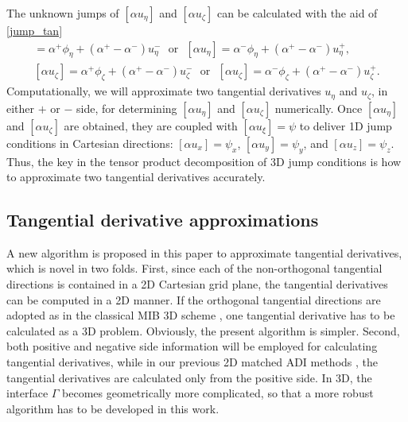 \documentclass[dissertation]{uathesis}
\begin{document}
\begin{body}
\begin{flushleft}
\hspace{1cm} The unknown jumps of $[\alpha u_{\eta}]$ and $[\alpha u_{\zeta}]$ can be calculated with the aid of \eqref{jump_tan}
\begin{align}
[\alpha u_{\eta}] = \alpha^{+}\phi_{\eta} + (\alpha^{+}-\alpha^{-})u^{-}_{\eta} ~~~ \mbox{or} ~~~ [\alpha u_{\eta}]  = \alpha^{-}\phi_{\eta} + (\alpha^{+}-\alpha^{-}) u^{+}_{\eta}, \label{alpha u_eta}    \\
[\alpha u_{\zeta}] = \alpha^{+}\phi_{\zeta} + (\alpha^{+}-\alpha^{-}) u^{-}_{\zeta} ~~~ \mbox{or} ~~~ [\alpha u_{\zeta}] = \alpha^{-}\phi_{\zeta} + (\alpha^{+}-\alpha^{-}) u^{+}_{\zeta}. \label{alpha u_zeta}
\end{align}
Computationally, we will approximate two tangential derivatives $u_{\eta}$ and $u_{\zeta}$, in either $+$ or $-$ side, for determining $[\alpha u_{\eta}]$ and $[\alpha u_{\zeta}]$ numerically. 
Once $[\alpha u_{\eta}]$ and $[\alpha u_{\zeta}]$ are obtained, they are coupled with  $[\alpha u_{\xi}] = \psi$ to deliver 1D jump conditions in Cartesian directions: 
$ [\alpha u_x]=\psi_x$, $ [\alpha u_y]=\psi_y$, and $ [\alpha u_z]=\psi_z$. 
Thus, the key in the tensor product decomposition of 3D jump conditions is how to approximate two tangential derivatives accurately. 

\subsection{Tangential derivative approximations}
\hspace{1cm} A new algorithm is proposed in this paper to approximate tangential derivatives, which is novel in two folds. 
First, since each of the non-orthogonal tangential directions is contained in a 2D Cartesian grid plane, the tangential derivatives can be computed in a 2D manner. If the orthogonal tangential directions are adopted as in the classical MIB 3D scheme \cite{yu2007three}, one tangential derivative has to be calculated as a 3D problem. Obviously, the present algorithm is  simpler. 
Second, both positive and negative side information will be employed for calculating tangential derivatives, while in our previous 2D matched ADI methods  \cite{zhao2015matched,li2017matched}, the tangential derivatives are calculated only from the positive side. 
In 3D, the interface $\Gamma$ becomes geometrically more complicated, so that a more robust algorithm has to be developed in this work. 



\end{flushleft}
\end{body}
\end{document}

